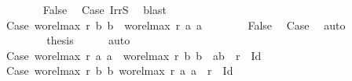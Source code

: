 \begin{isabellebody}
\ \ \ \ \ \ \isamarkupfalse%
\ False\ \isamarkupfalse%
\ Case{}\ IrrS\ \isamarkupfalse%
\ blast\isanewline
\ \ \ \ \ \isacommand{{\isacharbraceright}{\kern0pt}}\isamarkupfalse%
\isanewline
\ \ \ \ \ \isamarkupfalse%
\isanewline
\ \ \ \ \ \isacommand{{\isacharbraceleft}{\kern0pt}}\isamarkupfalse%
\isamarkupfalse%
\ Case{}{}{\isacharunderscore}{\kern0pt}{}{\isacharcolon}{\kern0pt}\ {\isachardoublequoteopen}wo{\isacharunderscore}{\kern0pt}rel{\isachardot}{\kern0pt}max{}\ r\ b{}\ b{}\ {\isacharequal}{\kern0pt}\ wo{\isacharunderscore}{\kern0pt}rel{\isachardot}{\kern0pt}max{}\ r\ a{}\ a{}{\isachardoublequoteclose}\isanewline
\ \ \ \ \ \ \isamarkupfalse%
\ False\ \isamarkupfalse%
\ Case{}\ \isamarkupfalse%
\ auto\isanewline
\ \ \ \ \ \isacommand{{\isacharbraceright}{\kern0pt}}\isamarkupfalse%
\isanewline
\ \ \ \ \ \isamarkupfalse%
\ \isamarkupfalse%
\ {\isacharquery}{\kern0pt}thesis\ \isamarkupfalse%
\ {}\ {}\ \isamarkupfalse%
\ auto\isanewline
\ \ \ \ \isacommand{{\isacharbraceright}{\kern0pt}}\isamarkupfalse%
\isanewline
\ \ \ \ \isamarkupfalse%
\isanewline
\ \ \ \ \isacommand{{\isacharbraceleft}{\kern0pt}}\isamarkupfalse%
\isamarkupfalse%
\ Case{}{\isacharcolon}{\kern0pt}\ {\isachardoublequoteopen}wo{\isacharunderscore}{\kern0pt}rel{\isachardot}{\kern0pt}max{}\ r\ a{}\ a{}\ {\isacharequal}{\kern0pt}\ wo{\isacharunderscore}{\kern0pt}rel{\isachardot}{\kern0pt}max{}\ r\ b{}\ b{}\ {\isasymand}\ {\isacharparenleft}{\kern0pt}a{}{\isacharcomma}{\kern0pt}b{}{\isacharparenright}{\kern0pt}\ {\isasymin}\ r\ {\isacharminus}{\kern0pt}\ Id{\isachardoublequoteclose}\isanewline
\ \ \ \ \ \isacommand{{\isacharbraceleft}{\kern0pt}}\isamarkupfalse%
\isamarkupfalse%
\ Case{}{}{\isacharcolon}{\kern0pt}\ {\isachardoublequoteopen}{\isacharparenleft}{\kern0pt}wo{\isacharunderscore}{\kern0pt}rel{\isachardot}{\kern0pt}max{}\ r\ b{}\ b{}{\isacharcomma}{\kern0pt}\ wo{\isacharunderscore}{\kern0pt}rel{\isachardot}{\kern0pt}max{}\ r\ a{}\ a{}{\isacharparenright}{\kern0pt}\ {\isasymin}\ r\ {\isacharminus}{\kern0pt}\ Id{\isachardoublequoteclose}\isanewline

\end{isabellebody}
